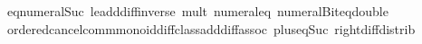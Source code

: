 \begin{isabellebody}
\ \ \ \ \ \ eq{\isacharunderscore}{\kern0pt}numeral{\isacharunderscore}{\kern0pt}Suc\ le{\isacharunderscore}{\kern0pt}add{\isacharunderscore}{\kern0pt}diff{\isacharunderscore}{\kern0pt}inverse{}\ mult{\isacharunderscore}{\kern0pt}{}\ numeral{\isacharunderscore}{\kern0pt}{}{\isacharunderscore}{\kern0pt}eq{\isacharunderscore}{\kern0pt}{}\ numeral{\isacharunderscore}{\kern0pt}Bit{}{\isacharunderscore}{\kern0pt}eq{\isacharunderscore}{\kern0pt}double\isanewline
\ \ \ \ \ \ ordered{\isacharunderscore}{\kern0pt}cancel{\isacharunderscore}{\kern0pt}comm{\isacharunderscore}{\kern0pt}monoid{\isacharunderscore}{\kern0pt}diff{\isacharunderscore}{\kern0pt}class{\isachardot}{\kern0pt}add{\isacharunderscore}{\kern0pt}diff{\isacharunderscore}{\kern0pt}assoc\ plus{\isacharunderscore}{\kern0pt}{}{\isacharunderscore}{\kern0pt}eq{\isacharunderscore}{\kern0pt}Suc\ right{\isacharunderscore}{\kern0pt}diff{\isacharunderscore}{\kern0pt}distrib{\isacharprime}{\kern0pt}{\isacharparenright}{\kern0pt}%
\endisatagproof
{\isafoldproof}%
%
\isadelimproof
\ \isanewline
%
\endisadelimproof
%
\isadelimtheory
%
\endisadelimtheory
%
\isatagtheory
{}\isamarkupfalse%
%
\endisatagtheory
{\isafoldtheory}%
%
\isadelimtheory
%
\endisadelimtheory
%
\end{isabellebody}%
\endinput
